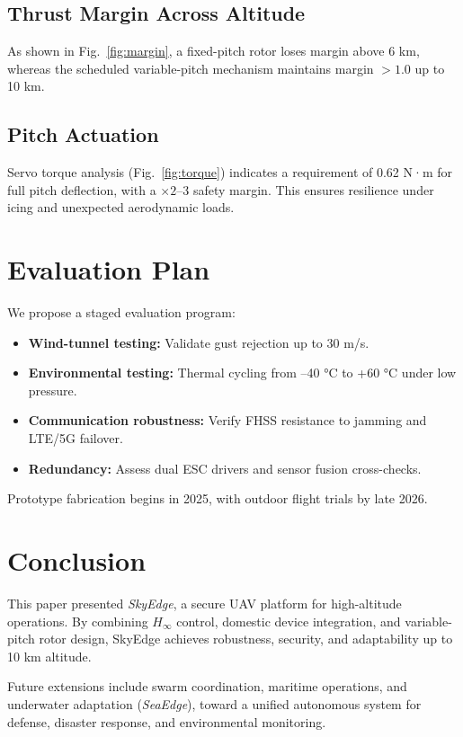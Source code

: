 \documentclass[conference]{IEEEtran}
\begin{document}
\subsection{Thrust Margin Across Altitude}
As shown in Fig.~\ref{fig:margin}, a fixed-pitch rotor loses margin 
above 6 km, whereas the scheduled variable-pitch mechanism maintains 
margin $>1.0$ up to 10 km.  

\subsection{Pitch Actuation}
Servo torque analysis (Fig.~\ref{fig:torque}) indicates a requirement 
of 0.62 N·m for full pitch deflection, with a $\times 2$--3 safety margin.  
This ensures resilience under icing and unexpected aerodynamic loads.  

\section{Evaluation Plan}
We propose a staged evaluation program:  

\begin{itemize}
    \item \textbf{Wind-tunnel testing:} Validate gust rejection up to 30 m/s.  
    \item \textbf{Environmental testing:} Thermal cycling from –40 °C to +60 °C under low pressure.  
    \item \textbf{Communication robustness:} Verify FHSS resistance to jamming and LTE/5G failover.  
    \item \textbf{Redundancy:} Assess dual ESC drivers and sensor fusion cross-checks.  
\end{itemize}

Prototype fabrication begins in 2025, with outdoor flight trials by late 2026.  

\section{Conclusion}
This paper presented \emph{SkyEdge}, a secure UAV platform for 
high-altitude operations. By combining $H_\infty$ control, 
domestic device integration, and variable-pitch rotor design, 
SkyEdge achieves robustness, security, and adaptability up to 
10 km altitude.  

Future extensions include swarm coordination, maritime operations, 
and underwater adaptation (\emph{SeaEdge}), toward a unified 
autonomous system for defense, disaster response, and 
environmental monitoring.  
\end{document}
